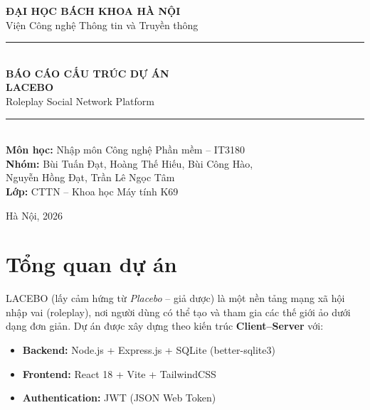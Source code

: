 \documentclass[12pt,a4paper]{article}
\begin{document}
\begin{titlepage}
\centering
\vspace*{2cm}

{\Huge\bfseries ĐẠI HỌC BÁCH KHOA HÀ NỘI\\[0.3cm]}
{\Large Viện Công nghệ Thông tin và Truyền thông\\[2cm]}

\rule{\textwidth}{1pt}\\[0.5cm]
{\LARGE\bfseries BÁO CÁO CẤU TRÚC DỰ ÁN\\[0.4cm]}
{\Huge\bfseries\color{sectioncolor} LACEBO\\[0.2cm]}
{\Large Roleplay Social Network Platform\\[0.5cm]}
\rule{\textwidth}{1pt}\\[1.5cm]

{\large\textbf{Môn học:} Nhập môn Công nghệ Phần mềm -- IT3180\\[0.3cm]}
{\large\textbf{Nhóm:} Bùi Tuấn Đạt, Hoàng Thế Hiếu, Bùi Công Hào,\\
Nguyễn Hồng Đạt, Trần Lê Ngọc Tâm\\[0.3cm]}
{\large\textbf{Lớp:} CTTN -- Khoa học Máy tính K69\\[2cm]}

{\large Hà Nội, 2026}
\end{titlepage}

\tableofcontents
\newpage

\section{Tổng quan dự án}

LACEBO (lấy cảm hứng từ \textit{Placebo} -- giả dược) là một nền tảng mạng xã hội nhập vai (roleplay), nơi người dùng có thể tạo và tham gia các thế giới ảo dưới dạng đơn giản. Dự án được xây dựng theo kiến trúc \textbf{Client--Server} với:

\begin{itemize}[leftmargin=2cm]
  \item \textbf{Backend:} Node.js + Express.js + SQLite (better-sqlite3)
  \item \textbf{Frontend:} React 18 + Vite + TailwindCSS
  \item \textbf{Authentication:} JWT (JSON Web Token)
\end{itemize}

\end{document}
